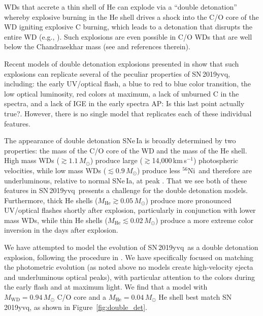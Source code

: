 \documentclass[twocolumn]{aastex63}
\newcommand{\abi}[1]{{\color{LincolnGreen} AP: {#1}}}
\newcommand{\kms}{km\,s$^{-1}$}
\newcommand{\radni}{$^{56}$Ni}
\newcommand{\sn}{SN\,2019yvq}
\begin{document}
WDs that accrete a thin shell of He can explode via a ``double detonation''
whereby explosive burning in the He shell drives a shock into the C/O core of
the WD igniting explosive C burning, which leads to a detonation that
disrupts the entire WD (e.g., \citealt{Nomoto82,Nomoto82a,Woosley94}). Such
explosions are even possible in C/O WDs that are well below the Chandrasekhar
mass (see \citealt{Fink07, Fink10} and references therein).

Recent models of double detonation explosions presented in \citet{Polin19}
show that such explosions can replicate several of the peculiar properties of
\sn, including: the early UV/optical flash, a blue to red to blue color
transition, the low optical luminosity, red colors at maximum, a lack of
unburned C in the spectra, and a lack of IGE in the early spectra \abi{Is
this last point actually true?}. However, there is no single model that
replicates each of these individual features.

The appearance of double detonation SNe\,Ia is broadly determined by two
properties: the mass of the C/O core of the WD and the mass of the He shell.
High mass WDs ($\gtrsim 1.1\,M_\odot$) produce large ($\gtrsim$14,000\,\kms)
photospheric velocities, while low mass WDs ($\lesssim 0.9\,M_\odot$) produce
less \radni\ and therefore are underluminous, relative to normal SNe\,Ia, at
peak \citep{Polin19}. That we see both of these features in \sn\ presents a
challenge for the \citet{Polin19} double detonation models. Furthermore,
thick He shells ($M_\mathrm{He} \gtrsim 0.05\,M_\odot$) produce more
pronounced UV/optical flashes shortly after explosion, particularly in
conjunction with lower mass WDs, while thin He shells ($M_\mathrm{He}
\lesssim 0.02\,M_\odot$) produce a more extreme color inversion in the days
after explosion.

We have attempted to model the evolution of \sn\ as a double detonation
explosion, following the procedure in \citet{Polin19}. We have specifically
focused on matching the photometric evolution (as noted above no models
create high-velocity ejecta and underluminous optical peaks), with particular
attention to the colors during the early flash and at maximum light. We find
that a model with $M_\mathrm{WD} = 0.94\,M_\odot$ C/O core and a
$M_\mathrm{He} = 0.04\,M_\odot$ He shell best match \sn, as shown in
Figure~\ref{fig:double_det}.
\end{document}
